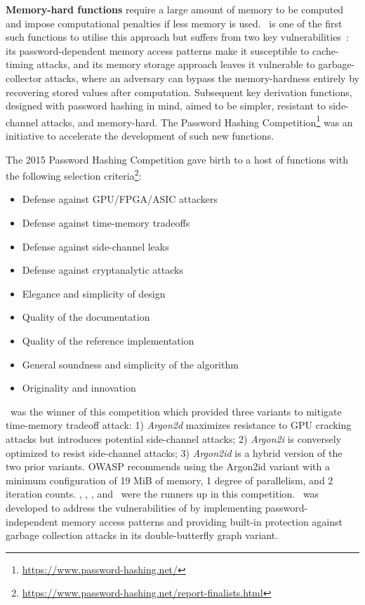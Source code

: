 \textbf{Memory-hard functions} require a large amount of memory to be computed and impose computational penalties if less memory is used. \scrypt\ is one of the first such functions to utilise this approach but suffers from two key vulnerabilities~\cite{forler2014memory}: its password-dependent memory access patterns make it susceptible to cache-timing attacks, and its memory storage approach leaves it vulnerable to garbage-collector attacks, where an adversary can bypass the memory-hardness entirely by recovering stored values after computation. Subsequent key derivation functions, designed with password hashing in mind, aimed to be simpler, resistant to side-channel attacks, and memory-hard. The Password Hashing Competition\footnote{\url{https://www.password-hashing.net/}} was an initiative to accelerate the development of such new functions.

The 2015 Password Hashing Competition gave birth to a host of functions with the following selection criteria\footnote{\url{https://www.password-hashing.net/report-finalists.html}}:
\begin{itemize}
    \item Defense against GPU/FPGA/ASIC attackers
    \item Defense against time-memory tradeoffs
    \item Defense against side-channel leaks
    \item Defense against cryptanalytic attacks
    \item Elegance and simplicity of design
    \item Quality of the documentation
    \item Quality of the reference implementation
    \item General soundness and simplicity of the algorithm
    \item Originality and innovation
\end{itemize}

\argontwo\ was the winner of this competition which provided three variants to mitigate time-memory tradeoff attack: 1) \textit{Argon2d} maximizes resistance to GPU cracking attacks but introduces potential side-channel attacks; 2) \textit{Argon2i} is conversely optimized to resist side-channel attacks; 3) \textit{Argon2id} is a hybrid version of the two prior variants. OWASP \cite{owasp_owasp_2024} recommends using the Argon2id variant with a minimum configuration of 19 MiB of memory, 1 degree of parallelism, and 2 iteration counts. \catena, \lyratwo, \makwa, and \yescrypt\ were the runners up in this competition. \catena\ was developed to address the vulnerabilities of \scrypt by implementing password-independent memory access patterns and providing built-in protection against garbage collection attacks in its double-butterfly graph variant.

